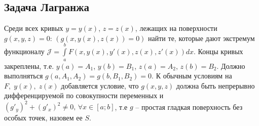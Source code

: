 \subsection{Задача Лагранжа}\par

Среди всех кривых $y=y(x)$, $z=z(x)$, лежащих на поверхности $g(x,y,z)=0$: $(g(x,y(x),z(x))=0)$ найти те, которые дают экстремум функционалу $\mathcal{J}=\int\limits_a^b F(x,y(x),y'(x),z(x),z'(x))d x$. Концы кривых закреплены, т.е. $y(a)=A_1$, $y(b)=B_1$, $z(a)=A_2$, $z(b)=B_2$.
Должно выполняться $g(a,A_1,A_2)= g(b,B_1,B_2)=0$. К обычным условиям на $F,\;y(x),\;z(x)$ добавляется условие, что $g(x,y,z)$ должна быть непрерывно дифференцируемой по совокупности переменных и $(g'_y)^2+(g'_x)^2\neq 0, \,\forall x \in [a;b]$, т.е $g$ -- простая гладкая поверхность без особых точек, назовем ее $S$.

